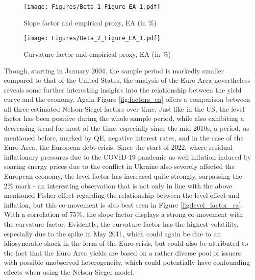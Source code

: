 \begin{figure}[!t]
    \centering
    \texttt{[image: Figures/Beta\_1\_Figure\_EA\_1.pdf]}
    \caption{Slope factor and empirical proxy, EA (in \%)}
    \label{fig:slope_factor_ea}
\end{figure}

\begin{figure}[!t]
    \centering
    \texttt{[image: Figures/Beta\_2\_Figure\_EA\_1.pdf]}
    \caption{Curvature factor and empirical proxy, EA (in \%)}
    \label{fig:curvature_factor_ea}
\end{figure}



Though, starting in January 2004, the sample period is markedly smaller compared to that of the United States, the analysis of the Euro Area nevertheless reveals some further interesting insights into the relationship between the yield curve and the economy.
Again Figure \ref{fig:factors_ea} offers a comparison between all three estimated Nelson-Siegel factors over time.
Just like in the US, the level factor has been positive during the whole sample period, while also exhibiting a decreasing trend for most of the time, especially since the mid 2010s, a period, as mentioned before, marked by QE, negative interest rates, and in the case of the Euro Area, the European debt crisis. 
Since the start of 2022, where residual inflationary pressures due to the COVID-19 pandemic as well inflation induced by soaring energy prices due to the conflict in Ukraine also severely affected the European economy, the level factor has increased quite strongly, surpassing the 2\% mark - an interesting observation that is not only in line with the above mentioned Fisher effect regarding the relationship between the level effect and inflation, but this co-movement is also best seen in Figure \ref{fig:level_factor_ea}. 
With a correlation of 75\%, the slope factor displays a strong co-movement with the curvature factor. 
Evidently, the curvature factor has the highest volatility, especially due to the spike in  May 2011, which could again be due to an idiosyncratic shock in the form of the Euro crisis, but could also be attributed  to the fact that the Euro Area yields are based on a rather diverse pool of issuers with possible unobserved heterogeneity, which could potentially have confounding effects when using the Nelson-Siegel model.

